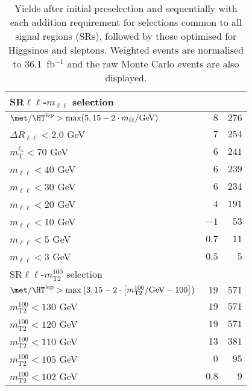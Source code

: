 \begin{table}
\begin{center}
\begin{tabular*}{\textwidth}{@{\extracolsep{\fill}}lrr}
\midrule
SR$\ell\ell$-$m_{\ell\ell}$ selection & \\ 
\midrule
$\met / \HT^\text{lep} > \text{max}(5, 15-2\cdot m_{\ell\ell}/\text{GeV})$ & $8$ & $276$   \\ 
    $\Delta R_{\ell\ell} < 2.0$ GeV & $7$ & $254$   \\ 
    $m_\text{T}^{\ell_1} < 70$ GeV & $6$ & $241$   \\ 
    $m_{\ell\ell} < 40$ GeV & $6$ & $239$   \\ 
    $m_{\ell\ell} < 30$ GeV & $6$ & $234$   \\ 
    $m_{\ell\ell} < 20$ GeV & $4$ & $191$   \\ 
    $m_{\ell\ell} < 10$ GeV & $-1$ & $53$   \\ 
    $m_{\ell\ell} < 5$ GeV & $0.7$ & $11$   \\ 
    $m_{\ell\ell} < 3$ GeV & $0.5$ & $5$   \\ 
    \midrule
SR$\ell\ell$-$m_\text{T2}^{100}$ selection & \\ 
\midrule
$\met / \HT^\text{lep} > \text{max}\left(3, 15-2\cdot \left[m_\text{T2}^{100}/\text{GeV} - 100\right]\right)$ & $19$ & $571$   \\ 
    $m_\text{T2}^{100} < 130$ GeV & $19$ & $571$   \\ 
    $m_\text{T2}^{100} < 120$ GeV & $19$ & $571$   \\ 
    $m_\text{T2}^{100} < 110$ GeV & $13$ & $381$   \\ 
    $m_\text{T2}^{100} < 105$ GeV & $0$ & $95$   \\ 
    $m_\text{T2}^{100} < 102$ GeV & $0.8$ & $9$   \\ 
    
  \bottomrule
  \end{tabular*}
\end{center}
\caption{ Yields after initial preselection and sequentially with each addition requirement 
for selections common to all signal regions (SRs), 
followed by those optimised for Higgsinos and sleptons. 
Weighted events are normalised to 36.1~fb$^{-1}$ and the raw Monte Carlo events are also displayed.
}
\label{tab:cutflow_Zttjets}
\end{table} 
  